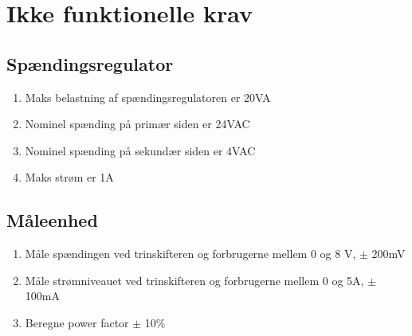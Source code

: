 
\section{Ikke funktionelle krav}

\subsection{Spændingsregulator}
\begin{enumerate}
	\item Maks belastning af spændingsregulatoren er 20VA
	\item Nominel spænding på primær siden er 24VAC
	\item Nominel spænding på sekundær siden er 4VAC
	\item Maks strøm er 1A	
\end{enumerate}

\subsection{Måleenhed}

\begin{enumerate}
	\item Måle spændingen ved trinskifteren og forbrugerne mellem 0 og 8 V, $\pm$ 200mV 
	\item Måle strømniveauet ved trinskifteren og forbrugerne mellem 0 og 5A, $\pm$ 100mA
	\item Beregne power factor $\pm$ 10$\%$
\end{enumerate}


